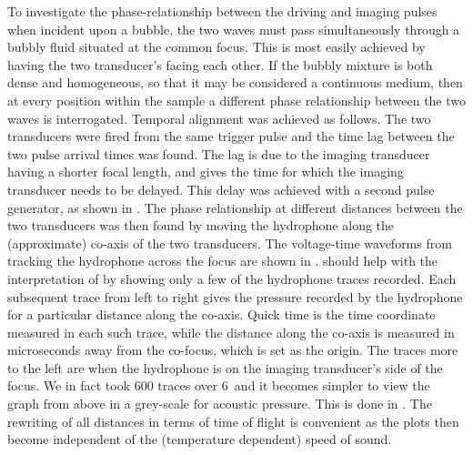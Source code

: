 To investigate the phase-relationship between the driving and imaging pulses
when incident upon a bubble,
the two waves must pass simultaneously through a bubbly fluid situated at the common focus.
This is most easily achieved by  having the two transducer's facing
each other. %
If the bubbly mixture is both dense and homogeneous,
so that it may be considered a continuous medium,
then at every position within the sample a different phase relationship
between the two waves is interrogated.
Temporal alignment was achieved as follows.
The two transducers were fired from the same trigger pulse and the time lag between the two pulse arrival times was found.
The lag is due to the imaging transducer having a shorter focal length,
and gives the time for which the imaging transducer needs to be delayed.
This delay was achieved with  a second pulse generator, as shown in .
The phase relationship at different distances between the two transducers was then found by moving the hydrophone
 along the (approximate) co-axis of the two transducers.
The voltage-time waveforms from tracking the hydrophone across the focus are shown in .
 should help with the interpretation of  
by showing only a few of the hydrophone traces recorded.
Each subsequent trace from left to right gives the pressure recorded by the hydrophone for a particular distance along the co-axis.
Quick time is the time coordinate measured in each such trace,
while the distance along the co-axis is measured in microseconds away from the co-focus, which is set as the origin.
The traces more to the left are when the hydrophone is on the imaging transducer's side of the focus.
We in fact took 600 traces over 6\milli\metre\ and it becomes simpler to view the graph from above in a grey-scale for acoustic pressure.
This is done in .  
The rewriting of all distances in terms of time of flight is convenient as the plots then become 
independent of the (temperature dependent) speed of sound.
